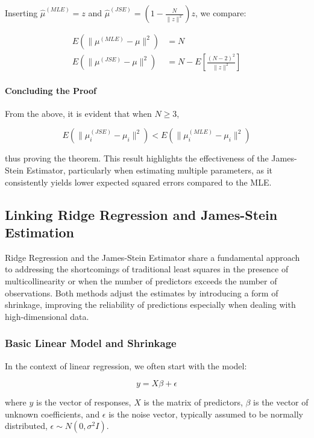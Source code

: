 Inserting \(\hat\mu^{(MLE)} = z\) and \(\hat\mu^{(JSE)} = \left(1-\frac{N}{\|z\|^2}\right)z\), we compare:

\begin{align}
    E(\|\mu^{(MLE)} - \mu\|^2) &= N \\
    E(\|\mu^{(JSE)} - \mu\|^2) &= N - E\left[\frac{(N-2)^2}{\|z\|^2}\right]
\end{align}

\paragraph{Concluding the Proof}

From the above, it is evident that when \(N \geq 3\),

\begin{equation}
    E(\|\mu_i^{(JSE)} - \mu_i\|^2) < E(\|\mu_i^{(MLE)} - \mu_i\|^2)
\end{equation}

thus proving the theorem. This result highlights the effectiveness of the James-Stein Estimator, particularly when estimating multiple parameters, as it consistently yields lower expected squared errors compared to the MLE.

\subsection{Linking Ridge Regression and James-Stein Estimation}

Ridge Regression and the James-Stein Estimator share a fundamental approach to addressing the shortcomings of traditional least squares in the presence of multicollinearity or when the number of predictors exceeds the number of observations. Both methods adjust the estimates by introducing a form of shrinkage, improving the reliability of predictions especially when dealing with high-dimensional data.

\subsubsection{Basic Linear Model and Shrinkage}

In the context of linear regression, we often start with the model:

\begin{equation}
    y = X\beta + \epsilon
\end{equation}

where \( y \) is the vector of responses, \( X \) is the matrix of predictors, \( \beta \) is the vector of unknown coefficients, and \( \epsilon \) is the noise vector, typically assumed to be normally distributed, \( \epsilon \sim N(0, \sigma^2I) \).

